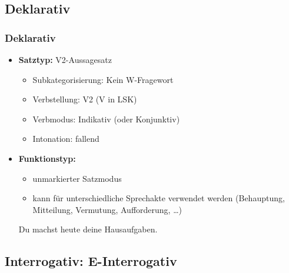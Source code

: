 \subsection{Deklarativ}


\begin{frame}
\frametitle{Deklarativ}

\begin{itemize}
	\item \textbf{Satztyp:} V2-Aussagesatz
	\begin{itemize}
		\item Subkategorisierung: Kein W-Fragewort
		\item Verbstellung: V2 (V in LSK)
		\item Verbmodus: Indikativ (oder Konjunktiv)
		\item Intonation: fallend
	\end{itemize}
	\item \textbf{Funktionstyp:}
	\begin{itemize}
		\item unmarkierter Satzmodus
		\item kann für unterschiedliche Sprechakte verwendet werden (Behauptung, Mitteilung, Vermutung, Aufforderung, \dots )
	\end{itemize}
	
	\ea Du machst heute deine Hausaufgaben.
	\z
	
\end{itemize}

\end{frame}


\subsection{Interrogativ: E-Interrogativ}


